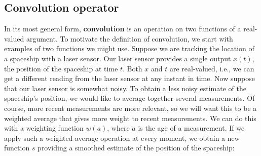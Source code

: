 \subsection{Convolution operator}
In its most general form, \textbf{convolution} is an operation on two functions of a real-valued argument. To motivate the definition of convolution, we start with examples of two functions we might use.\newline\newline
Suppose we are tracking the location of a spaceship with a laser sensor. Our
laser sensor provides a single output $x(t)$, the position of the spaceship at time $t$. Both $x$ and $t$ are real-valued, i.e., we can get a different reading from the laser sensor at any instant in time.\newline\newline
Now suppose that our laser sensor is somewhat noisy. To obtain a less noisy
estimate of the spaceship’s position, we would like to average together several measurements. Of course, more recent measurements are more relevant, so we will want this to be a weighted average that gives more weight to recent measurements. We can do this with a weighting function $w(a)$, where $a$ is the age of a measurement. If we apply such a weighted average operation at every moment, we obtain a new function $s$ providing a smoothed estimate of the position of the spaceship:

